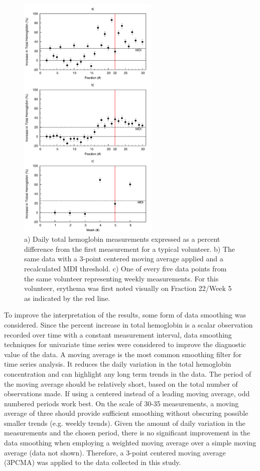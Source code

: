 \begin{figure}
	\centering \includegraphics[width=0.6\textwidth]{figures/p4-combined_fig.png}
	\caption[Increases in total hemoglobin concentration for a representative patient]{\label{fig:p4-combined_fig}a) Daily total hemoglobin measurements expressed as a percent difference from the first measurement for a typical volunteer. b) The same data with a 3-point centered moving average applied and a recalculated MDI threshold. c) One of every five data points from the same volunteer representing weekly measurements. For this volunteer, erythema was first noted visually on Fraction 22/Week 5 as indicated by the red line.}
\end{figure}

To improve the interpretation of the results, some form of data smoothing was considered. Since the percent increase in total hemoglobin is a scalar observation recorded over time with a constant measurement interval, data smoothing techniques for univariate time series were considered to improve the diagnostic value of the data.\cite{Prins2013} A moving average is the most common smoothing filter for time series analysis. It reduces the daily variation in the total hemoglobin concentration and can highlight any long term trends in the data. The period of the moving average should be relatively short, based on the total number of observations made. If using a centered instead of a leading moving average, odd numbered periods work best. On the scale of 30-35 measurements, a moving average of three should provide sufficient smoothing without obscuring possible smaller trends (e.g. weekly trends). Given the amount of daily variation in the measurements and the chosen period, there is no significant improvement in the data smoothing when employing a weighted moving average over a simple moving average (data not shown). Therefore, a 3-point centered moving average (3PCMA) was applied to the data collected in this study.

